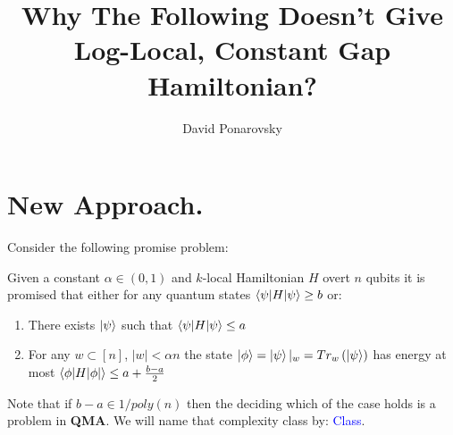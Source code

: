 \documentclass[manuscript,screen,review]{acmart}
\begin{document}


\title{Why The Following Doesn't Give Log-Local, Constant Gap Hamiltonian?} 
\author{David Ponarovsky}

\ifdefined\ACM
\else
  \maketitle
\fi
%
\ifdefined\ACM
  \maketitle
\fi

\newcommand{\Hin}{H_{\text{init}}}
  \newcommand{\Hpr}{H_{\text{prop}}}
\newcommand{\Hen}{H_{\text{end}}}

\newcommand{\CLASS}{\textcolor{blue}{Class}}


\section{New Approach.}

Consider the following promise problem: 

\begin{definition}
  \label{def:class}
  Given a constant $\alpha\in (0,1)$ and $k$-local Hamiltonian $H$ overt $n$ qubits it is promised that either for any quantum states $\braket{\psi|H|\psi} \ge b$ or:\begin{enumerate}
    \item There exists $\ket{\psi}$ such that $\braket{\psi|H|\psi} \le a$
    \item For any $w\subset [n]$, $|w| < \alpha n $ the state $\ket{\phi} = \ket{\psi}|_{w} = Tr_{w}\left( \ket{\psi} \right)$ has energy at most $\braket{\phi|H|\phi|} \le a + \frac{b-a}{2}$
  \end{enumerate}
  Note that if $b-a \in 1/poly(n)$ then the deciding which of the case holds is a problem in \textbf{QMA}. We will name that complexity class by: \CLASS. 
\end{definition}
\end{document}
